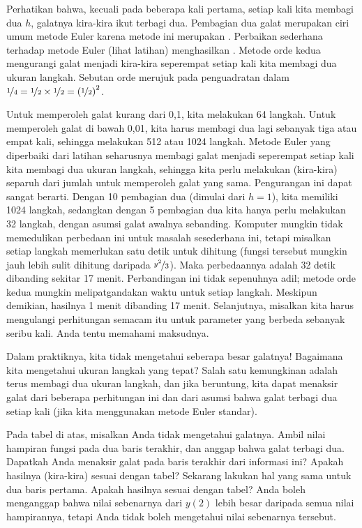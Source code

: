 Perhatikan bahwa, kecuali pada beberapa kali pertama, setiap kali kita membagi dua
$h$, galatnya kira-kira ikut terbagi dua.
Pembagian dua galat merupakan ciri umum metode Euler karena metode ini merupakan
\emph{}.
Perbaikan sederhana terhadap metode Euler (lihat latihan)
menghasilkan .
Metode orde kedua
mengurangi galat menjadi kira-kira
seperempat setiap kali kita membagi dua ukuran langkah.  Sebutan orde
 merujuk pada penguadratan dalam
$\nicefrac{1}{4} = \nicefrac{1}{2} \times \nicefrac{1}{2}
= {(\nicefrac{1}{2})}^2$.

Untuk memperoleh galat kurang dari 0,1, kita melakukan
64 langkah.  Untuk memperoleh galat di bawah 0,01, kita harus membagi dua lagi sebanyak tiga atau
empat kali, sehingga melakukan 512 atau 1024 langkah.
Metode Euler yang diperbaiki dari latihan
seharusnya membagi galat menjadi seperempat
setiap kali kita membagi dua ukuran langkah,
sehingga kita perlu melakukan (kira-kira) separuh dari jumlah
 untuk memperoleh galat yang sama.  Pengurangan ini dapat sangat berarti.  Dengan 10
pembagian dua (dimulai dari $h=1$), kita memiliki 1024 langkah, sedangkan dengan 5 pembagian dua
kita hanya perlu melakukan 32 langkah, dengan asumsi galat awalnya
sebanding.  Komputer mungkin tidak memedulikan
perbedaan ini untuk masalah sesederhana ini, tetapi misalkan setiap langkah memerlukan
satu detik untuk dihitung (fungsi tersebut mungkin jauh lebih sulit dihitung
daripada $\nicefrac{y^2}{3}$).  Maka perbedaannya adalah 32 detik dibanding sekitar 17 menit.
Perbandingan ini tidak sepenuhnya adil; metode orde kedua mungkin
melipatgandakan waktu untuk setiap langkah.  Meskipun demikian, hasilnya 1 menit dibanding 17 menit.
Selanjutnya, misalkan kita harus mengulangi perhitungan semacam itu untuk parameter yang berbeda
sebanyak seribu kali.  Anda tentu memahami maksudnya.

Dalam praktiknya, kita tidak mengetahui seberapa besar galatnya!
Bagaimana kita mengetahui
ukuran langkah yang tepat?  Salah satu kemungkinan adalah terus membagi dua ukuran langkah,
dan jika
beruntung, kita dapat menaksir galat dari beberapa perhitungan ini dan dari
asumsi bahwa galat terbagi dua setiap kali
(jika kita menggunakan metode Euler standar).

\begin{exercise}
Pada tabel di atas, misalkan Anda tidak mengetahui galatnya.  Ambil
nilai hampiran fungsi pada dua baris terakhir,
dan anggap bahwa galat terbagi dua.  Dapatkah Anda menaksir
galat pada baris terakhir dari informasi ini? Apakah hasilnya (kira-kira) sesuai dengan
tabel? Sekarang lakukan hal yang sama untuk dua baris pertama. Apakah hasilnya sesuai dengan tabel?
Anda boleh menganggap bahwa nilai sebenarnya dari $y(2)$ lebih besar daripada semua
nilai hampirannya, tetapi Anda tidak boleh mengetahui nilai sebenarnya tersebut.
\end{exercise}

